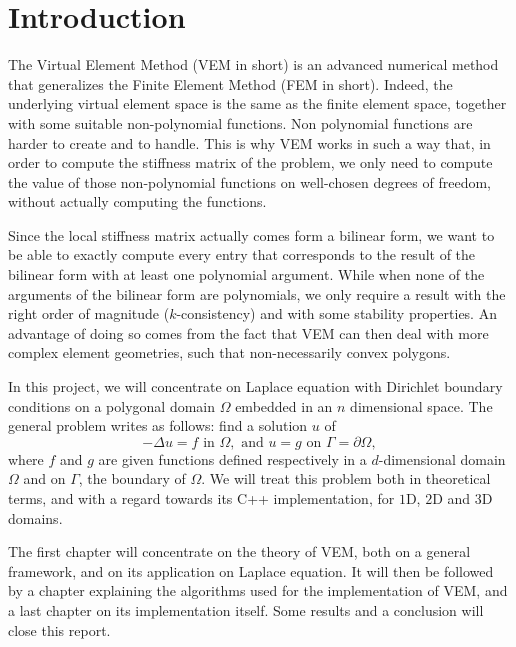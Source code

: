\newpage
\section*{Introduction} 

The Virtual Element Method (VEM in short) is an advanced numerical method that generalizes the Finite Element Method (FEM in short). Indeed, the underlying virtual element space is the same as the finite element space, together with some suitable non-polynomial functions. Non polynomial functions are harder to create and to handle. This is why VEM works in such a way that, in order to compute the stiffness matrix of the problem, we only need to compute the value of those non-polynomial functions on well-chosen degrees of freedom, without actually computing the functions. 

Since the local stiffness matrix actually comes form a bilinear form, we want to be able to exactly compute every entry that corresponds to the result of the bilinear form with at least one polynomial argument. While when none of the arguments of the bilinear form are polynomials, we only require a result with the right order of magnitude ($k$-consistency) and with some stability properties. An advantage of doing so comes from the fact that VEM can then deal with more complex element geometries, such that non-necessarily convex polygons.\newline 

In this project, we will concentrate on Laplace equation with Dirichlet boundary conditions on a polygonal domain $\Omega$ embedded in an $n$ dimensional space. The general problem writes as follows: find a solution $u$ of
$$ -\Delta u = f \text{ in } \Omega, \text{ and } u = g \text{ on } \Gamma = \partial \Omega, $$
where $f$ and $g$ are given functions defined respectively in a $d$-dimensional domain $\Omega$ and on $\Gamma$, the boundary of $\Omega$.
We will treat this problem both in theoretical terms, and with a regard towards its C++ implementation, for $1$D, $2$D and $3$D domains. \newline

The first chapter will concentrate on the theory of VEM, both on a general framework, and on its application on Laplace equation. It will then be followed by a chapter explaining the algorithms used for the implementation of VEM, and a last chapter on its implementation itself. Some results and a conclusion will close this report. 


